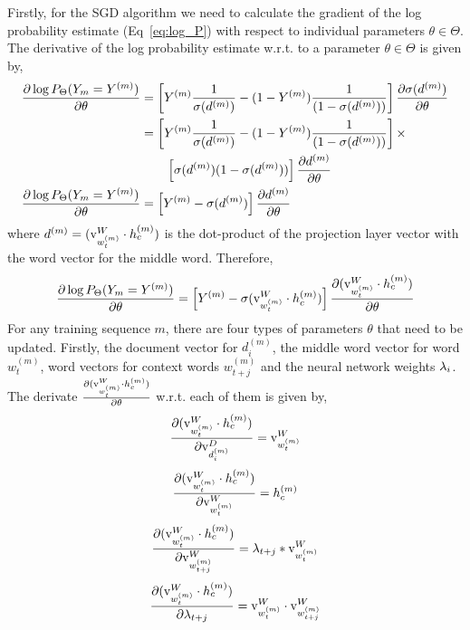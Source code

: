 Firstly, for the SGD algorithm we need to calculate the gradient of the log probability estimate (Eq~\ref{eq:log_P}) with respect to individual parameters $\theta \in \Theta$. The derivative of the log probability estimate w.r.t. to a parameter $\theta \in \Theta$ is given by,
\begin{align}
\frac{\partial \log P_{\Theta}(Y_{m}=Y^{(m)})} {\partial \theta} &= \left[ Y^{(m)}\frac{1}{\sigma(d^{(m)})} - (1-Y^{(m)})\frac{1}{(1 - \sigma(d^{(m)}))}\right] \frac{\partial \sigma(d^{(m)})}{\partial \theta} \\
&= \left[ Y^{(m)}\frac{1}{ \sigma(d^{(m)})} - (1 - Y^{(m)})\frac{1}{(1 - \sigma(d^{(m)}))}\right]\times\notag\\ &\qquad\left[\sigma(d^{(m)})(1-\sigma(d^{(m)}))\right]\frac{\partial d^{(m)}}{\partial \theta} \\
\frac{\partial \log P_{\Theta}(Y_{m}=Y^{(m)})} {\partial \theta} &= \left[ Y^{(m)} - \sigma(d^{(m)})\right] \frac{\partial d^{(m)}}{\partial \theta}
\end{align}
where $d^{(m)} = (\mathrm{v}^{W}_{w^{(m)}_{t}} \cdot h^{(m)}_{c})$ is the dot-product of the projection layer vector with the word vector for the middle word. Therefore,
\begin{equation}
\label{eq:partial_theta}
\frac{\partial \log P_{\Theta}(Y_{m}=Y^{(m)})} {\partial \theta} = \left[ Y^{(m)} - \sigma(\mathrm{v}^{W}_{w^{(m)}_{t}} \cdot h^{(m)}_{c})\right] \frac{\partial (\mathrm{v}^{W}_{w^{(m)}_{t}} \cdot h^{(m)}_{c})}{\partial \theta}
\end{equation}
For any training sequence $m$, there are four types of parameters $\theta$ that need to be updated. Firstly, the document vector for $d^{(m)}_{i}$, the middle word vector for word $w^{(m)}_{t}$, word vectors for context words $w^{(m)}_{t+j}$ and the neural network weights $\lambda_{i}$. The derivate $\frac{\partial (\mathrm{v}^{W}_{w^{(m)}_{t}} \cdot h^{(m)}_{c})}{\partial \theta}$ w.r.t. each of them is given by,
\begin{equation}
\label{eq:partial_doc}
\frac{\partial (\mathrm{v}^{W}_{w^{(m)}_{t}} \cdot h^{(m)}_{c})}{\partial \mathrm{v}^{D}_{d^{(m)}_{i}}} = \mathrm{v}^{W}_{w^{(m)}_{t}}
\end{equation}
\begin{equation}
\label{eq:partial_w_t}
\frac{\partial (\mathrm{v}^{W}_{w^{(m)}_{t}} \cdot h^{(m)}_{c})}{\partial \mathrm{v}^{W}_{w^{(m)}_{t}}} = h^{(m)}_{c}
\end{equation}
\begin{equation}
\label{eq:partial_w_t-k}
\frac{\partial (\mathrm{v}^{W}_{w^{(m)}_{t}} \cdot h^{(m)}_{c})}{\partial \mathrm{v}^{W}_{w^{(m)}_{t+j}}} = \lambda_{t+j}* \mathrm{v}^{W}_{w^{(m)}_{t}}
\end{equation}
\begin{equation}
\label{eq:partial_wgt_t-k}
\frac{\partial (\mathrm{v}^{W}_{w^{(m)}_{t}} \cdot h^{(m)}_{c})}{\partial \lambda_{t+j}} = \mathrm{v}^{W}_{w^{(m)}_{t}} \cdot \mathrm{v}^{W}_{w^{(m)}_{t+j}}
\end{equation}

